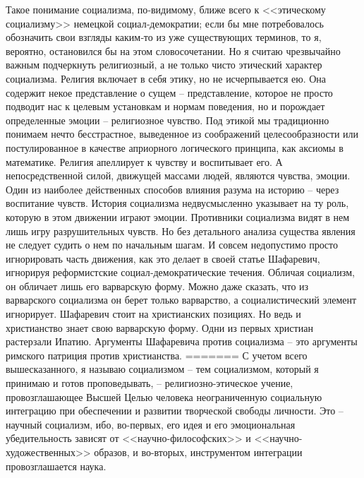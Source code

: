 \documentclass{book}
\begin{document}
Такое понимание социализма, по‑видимому, ближе всего к <<этическому социализму>> немецкой социал‑демократии; если бы мне потребовалось обозначить свои взгляды каким‑то из уже существующих терминов, то я, вероятно, остановился бы на этом словосочетании. Но я считаю чрезвычайно важным под­черкнуть религиозный, а не только чисто этический характер социализма. Религия включает в себя этику, но не исчерпывает­ся ею. Она содержит некое представление о сущем -- представ­ление, которое не просто подводит нас к целевым установкам и нормам поведения, но и порождает определенные эмоции -- религиозное чувство. Под этикой мы традиционно понимаем нечто бесстрастное, выведенное из соображений целесообраз­ности или постулированное в качестве априорного логического принципа, как аксиомы в математике. Религия апеллирует к чувству и воспитывает его. А непосредственной силой, движу­щей массами людей, являются чувства, эмоции. Один из наибо­лее действенных способов влияния разума на историю -- через воспитание чувств. История социализма недвусмысленно указы­вает на ту роль, которую в этом движении играют эмоции. Про­тивники социализма видят в нем лишь игру разрушительных чувств. Но без детального анализа существа явления не следует судить о нем по начальным шагам. И совсем недопустимо про­сто игнорировать часть движения, как это делает в своей статье Шафаревич, игнорируя реформистские социал‑демократические течения. Обличая социализм, он обличает лишь его варварскую форму. Можно даже сказать, что из варварского социализма он берет только варварство, а социалистический элемент игно­рирует. Шафаревич стоит на христианских позициях. Но ведь и христианство знает свою варварскую форму. Одни из первых христиан растерзали Ипатию. Аргументы Шафаревича против социализма -- это аргументы римского патриция против хри­стианства.
=======
С учетом всего вышесказанного, я называю социализмом -- тем социализмом, который я принимаю и готов проповеды­вать, -- религиозно-этическое учение, провозглашающее Высшей Целью человека неограниченную социальную интеграцию при обеспечении и развитии творческой свободы личности. Это -- научный социализм, ибо, во-первых, его идея и его эмоциональ­ная убедительность зависят от <<научно-философских>> и <<науч­но-художественных>> образов, и во-вторых, инструментом ин­теграции провозглашается наука.
\end{document}
